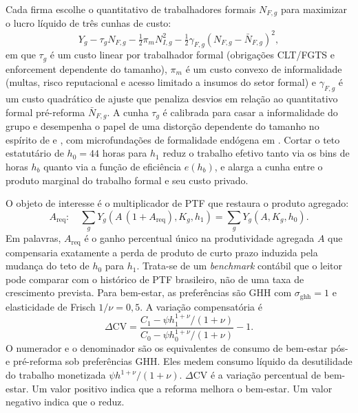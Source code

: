 \documentclass[10pt,twocolumn]{article}
\begin{document}
Cada firma escolhe o quantitativo de trabalhadores formais $N_{F,g}$ para maximizar o lucro l\'iquido de tr\^es cunhas de custo:
\begin{equation}\label{eq:firm}
Y_g-\tau_g N_{F,g}-\tfrac{1}{2}\pi_m N_{I,g}^2-\tfrac{1}{2}\gamma_{F,g}(N_{F,g}-\bar{N}_{F,g})^2,
\end{equation}
em que $\tau_g$ \'e um custo linear por trabalhador formal (obriga\c{c}\~oes CLT/FGTS e enforcement dependente do tamanho), $\pi_m$ \'e um custo convexo de informalidade (multas, risco reputacional e acesso limitado a insumos do setor formal) e $\gamma_{F,g}$ \'e um custo quadr\'atico de ajuste que penaliza desvios em rela\c{c}\~ao ao quantitativo formal pr\'e-reforma $\bar{N}_{F,g}$. A cunha $\tau_g$ \'e calibrada para casar a informalidade do grupo e desempenha o papel de uma distor\c{c}\~ao dependente do tamanho no esp\'irito de \citet{HsiehKlenow2009} e \citet{RestucciaRogerson2008}, com microfunda\c{c}\~oes de formalidade end\'ogena em \citet{DixCarneiroGoldbergMeghirUlyssea2026}. Cortar o teto estatut\'ario de $h_0=44$ horas para $h_1$ reduz o trabalho efetivo tanto via os bins de horas $h_b$ quanto via a fun\c{c}\~ao de efici\^encia $e(h_b)$, e alarga a cunha entre o produto marginal do trabalho formal e seu custo privado.

O objeto de interesse \'e o multiplicador de PTF que restaura o produto agregado:
\begin{equation}\label{eq:areq}
A_{\text{req}}:\quad \sum_g Y_g\!\left(A\,(1+A_{\text{req}}),K_g,h_1\right)=\sum_g Y_g(A,K_g,h_0).
\end{equation}
Em palavras, $A_{\text{req}}$ \'e o ganho percentual \'unico na produtividade agregada $A$ que compensaria exatamente a perda de produto de curto prazo induzida pela mudan\c{c}a do teto de $h_0$ para $h_1$. Trata-se de um \emph{benchmark} cont\'abil que o leitor pode comparar com o hist\'orico de PTF brasileiro, n\~ao de uma taxa de crescimento prevista. Para bem-estar, as prefer\^encias s\~ao GHH \citep{GreenwoodHercowitzHuffman1988} com $\sigma_{\text{ghh}}=1$ e elasticidade de Frisch $1/\nu=0{,}5$. A varia\c{c}\~ao compensat\'oria \'e
\begin{equation}\label{eq:cv}
\Delta\text{CV}=\frac{C_1-\psi h_1^{1+\nu}/(1+\nu)}{C_0-\psi h_0^{1+\nu}/(1+\nu)}-1.
\end{equation}
O numerador e o denominador s\~ao os equivalentes de consumo de bem-estar p\'os- e pr\'e-reforma sob prefer\^encias GHH. Eles medem consumo l\'iquido da desutilidade do trabalho monetizada $\psi h^{1+\nu}/(1+\nu)$. $\Delta$CV \'e a varia\c{c}\~ao percentual de bem-estar. Um valor positivo indica que a reforma melhora o bem-estar. Um valor negativo indica que o reduz.
\end{document}

